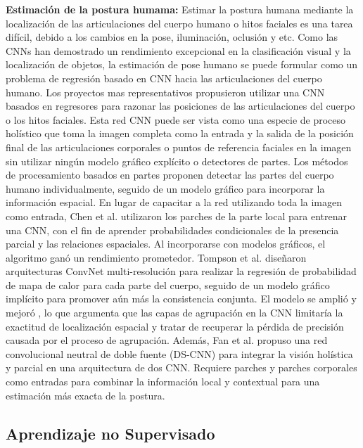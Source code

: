 \textbf{Estimación de la postura humama:}  Estimar la postura humana mediante la localización de las articulaciones del cuerpo humano o hitos faciales es una tarea difícil, debido a los cambios en la pose, iluminación, oclusión y etc. Como las CNNs han demostrado un rendimiento excepcional en la clasificación visual y la localización de objetos, la estimación de pose humano se puede formular como un problema de regresión basado en CNN hacia las articulaciones del cuerpo humano. Los proyectos mas representativos \cite{Toshev,Li} propusieron utilizar una  CNN basados en regresores para razonar las posiciones de las articulaciones del cuerpo o los hitos faciales.  Esta red CNN   puede ser vista como una especie de proceso holístico que toma la imagen completa como la entrada y la salida de la posición final de las articulaciones corporales o puntos de referencia faciales en la imagen sin utilizar ningún modelo gráfico explícito o detectores de partes. Los métodos de procesamiento basados en partes proponen detectar las partes del cuerpo humano individualmente, seguido de un modelo gráfico para incorporar la información espacial. En lugar de capacitar a la red utilizando toda la imagen como entrada, Chen et al.  \cite{ChenX} utilizaron los parches de la parte local para entrenar una CNN, con el fin de aprender probabilidades condicionales de la presencia parcial y las relaciones espaciales. Al incorporarse con modelos gráficos, el algoritmo ganó un rendimiento prometedor. Tompson et al. \cite{Tompson} diseñaron arquitecturas ConvNet multi-resolución para realizar la regresión de probabilidad de mapa de calor para cada parte del cuerpo, seguido de un modelo gráfico implícito para promover aún más la consistencia conjunta. El modelo se amplió y mejoró  \cite{Tompson}, lo que argumenta que las capas de agrupación en la CNN limitaría la exactitud de localización espacial y tratar de recuperar la pérdida de precisión causada por el proceso de agrupación. Además, Fan et al.  \cite{Fan} propuso una red convolucional neutral de doble fuente (DS-CNN) para integrar la visión holística y parcial en una arquitectura de dos CNN. Requiere parches y parches corporales como entradas para combinar la información local y contextual para una estimación más exacta de la postura.
 
 
\subsection{Aprendizaje no Supervisado}\label{sec:nosupervisado}

